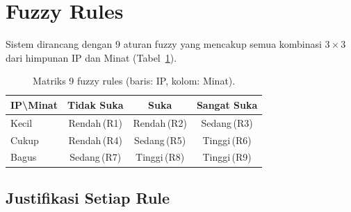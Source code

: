 \documentclass[conference]{IEEEtran}
\begin{document}
\section{Fuzzy Rules}
\label{sec:rules}

Sistem dirancang dengan 9 aturan fuzzy yang mencakup semua kombinasi
$3 \times 3$ dari himpunan IP dan Minat (Tabel~\ref{tab:rules}).

\begin{table}[htbp]
\centering\caption{Matriks 9 fuzzy rules (baris: IP, kolom: Minat).}
\label{tab:rules}
\begin{tabular}{@{}lccc@{}}
\toprule
\textbf{IP\textbackslash Minat} & \textbf{Tidak Suka} & \textbf{Suka} & \textbf{Sangat Suka} \\
\midrule
Kecil  & Rendah\,(R1) & Rendah\,(R2) & Sedang\,(R3) \\
Cukup  & Rendah\,(R4) & Sedang\,(R5) & Tinggi\,(R6) \\
Bagus  & Sedang\,(R7) & Tinggi\,(R8) & Tinggi\,(R9) \\
\bottomrule
\end{tabular}
\end{table}

\subsection{Justifikasi Setiap Rule}
\end{document}
